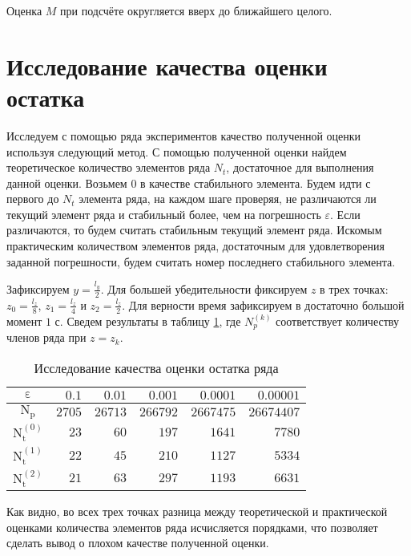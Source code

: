 Оценка $M$ при подсчёте округляется вверх до ближайшего целого.

\section{Исследование качества оценки остатка}
Исследуем с помощью ряда экспериментов качество полученной оценки используя следующий метод. С помощью полученной оценки найдем
теоретическое количество элементов ряда $N_t$, достаточное для выполнения данной оценки. Возьмем $0$ в качестве стабильного элемента. 
Будем идти с первого до $N_t$ элемента ряда, на каждом шаге проверяя, не различаются ли текущий элемент ряда и стабильный более, чем
на погрешность $\varepsilon$. Если различаются, то будем считать стабильным текущий элемент ряда. Искомым практическим количеством
элементов ряда, достаточным для удовлетворения заданной погрешности, будем считать номер последнего стабильного элемента.

Зафиксируем $y = \frac{l_y}{2}$. Для большей убедительности фиксируем $z$ в трех точках: $z_0 = \frac{l_z}{8}$, $z_1 = \frac{l_z}{4}$ 
и $z_2 = \frac{l_z}{2}$. Для верности время зафиксируем в достаточно большой момент $1$ с. Сведем результаты в таблицу 
\ref{tab:rem:experiment}, где $N_{p}^{(k)}$ соответствует количеству членов ряда при $z = z_k$.

\begin{table}[!hbtp]
  \centering
  \caption{Исследование качества оценки остатка ряда}
  \begin{tabular}{|c|r|r|r|r|r|}
    \hline
    $\mathrm{\varepsilon}$ & $0.1$ & $0.01$ & $0.001$ & $0.0001$ & $0.00001$ \\
    \hline
    $\mathrm{N_p}$ & $2705$ & $26713$ & $266792$ & $2667475$ & $26674407$ \\
    \hline
    $\mathrm{N_t^{(0)}}$ & $23$ & $60$ & $197$ & $1641$ & $7780$ \\
    \hline
    $\mathrm{N_t^{(1)}}$ & $22$ & $45$ & $210$ & $1127$ & $5334$ \\
    \hline
    $\mathrm{N_t^{(2)}}$ & $21$ & $63$ & $297$ & $1193$ & $6631$ \\
    \hline
  \end{tabular}
  \label{tab:rem:experiment}
\end{table}

Как видно, во всех трех точках разница между теоретической и практической оценками количества элементов ряда исчисляется порядками,
что позволяет сделать вывод о плохом качестве полученной оценки.
